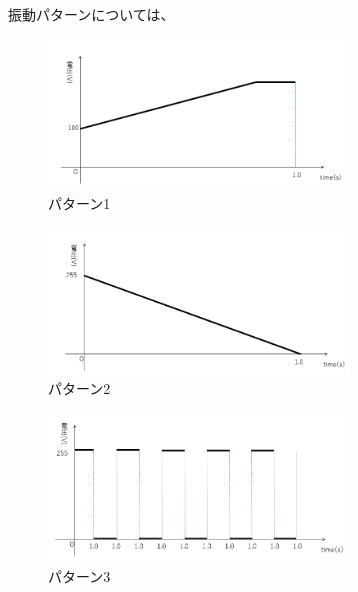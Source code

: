 振動パターンについては、



\begin{figure}[b]
\centering
\includegraphics[clip,width=8cm]{./fig/patarn1.png}
\caption{パターン1}\label{patarn1}
\end{figure}

\begin{figure}[b]
\centering
\includegraphics[clip,width=8cm]{./fig/patarn2.png}
\caption{パターン2}\label{patarn2}
\end{figure}

\begin{figure}[b]
\centering
\includegraphics[clip,width=8cm]{./fig/patarn3.png}
\caption{パターン3}\label{patarn3}
\end{figure}

